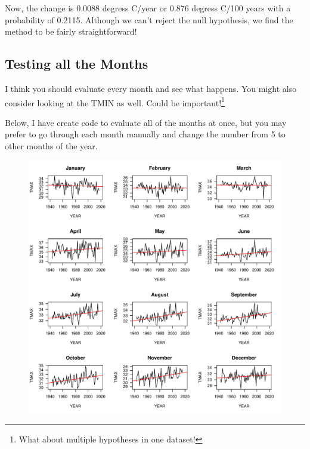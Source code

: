 \documentclass{article}\usepackage[]{graphicx}\usepackage[]{color}
\makeatletter
\def\maxwidth{ %
  \ifdim\Gin@nat@width>\linewidth
    \linewidth
  \else
    \Gin@nat@width
  \fi
}
\newenvironment{knitrout}{}{} %
\makeatother
\begin{document}
\begin{knitrout}
\end{knitrout}

Now, the change is 0.0088 degress C/year or 0.876 degress C/100 years with a probability of 0.2115. Although we can't reject the null hypothesis, we find the method to be fairly straightforward! 


\subsection{Testing all the Months}

I think you should evaluate every month and see what happens. You might also consider looking at the TMIN as well. Could be important!\footnote{What about multiple hypotheses in one dataset!}

Below, I have create code to evaluate all of the months at once, but you may prefer to go through each month manually and change the number from 5 to other months of the year. 

\begin{figure}
\begin{knitrout}
\color{fgcolor}
\includegraphics[width=\maxwidth]{figure/12MonthsTMAX-1} 

\end{knitrout}
\end{figure}
\end{document}
